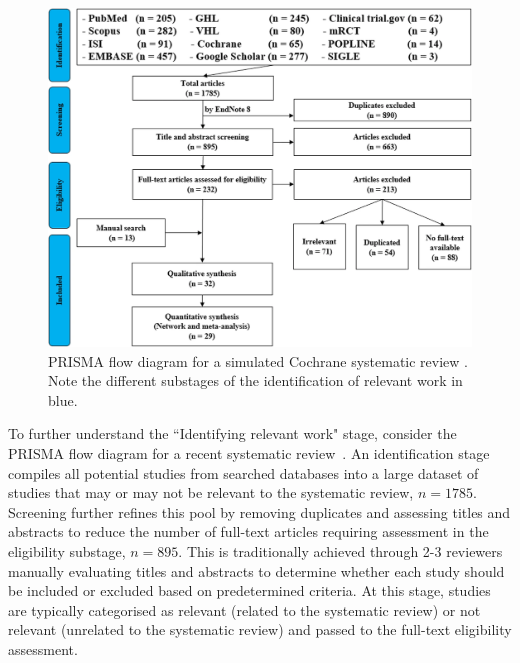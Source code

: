 \documentclass[10pt,oneside]{book}
\begin{document}
\begin{figure}
    \centering
    \includegraphics[width=1\linewidth]{Confirmation Review//images/prisma_flow.png}
    \caption{PRISMA flow diagram for a simulated Cochrane systematic review \cite{tawfik_protocol_2020}. Note the different substages of the identification of relevant work in blue.\protect\footnotemark}
    \label{fig:prisma_flow}
\end{figure}


To further understand the ``Identifying relevant work" stage, consider the PRISMA flow diagram for a recent systematic review~\cite{tawfik_protocol_2020}. An identification stage compiles all potential studies from searched databases into a large dataset of studies that may or may not be relevant to the systematic review, $n=1785$. Screening further refines this pool by removing duplicates and assessing titles and abstracts to reduce the number of full-text articles requiring assessment in the eligibility substage, $n=895$. This is traditionally achieved through 2-3 reviewers manually evaluating titles and abstracts to determine whether each study should be included or excluded based on predetermined criteria. At this stage, studies are typically categorised as relevant (related to the systematic review) or not relevant (unrelated to the systematic review) and passed to the full-text eligibility assessment.

\end{document}
